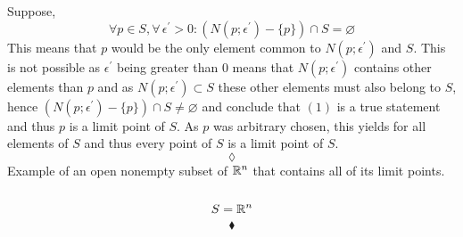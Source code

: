 Suppose, 
$$\forall p\in S, \forall\, \epsilon^{'}>0: \left(N(p;\epsilon^{'})-\{p\}\right)\cap S= \varnothing $$
This means that $p$ would be the only element common to $N(p;\epsilon^{'})$ and $S$. This is not possible as $\epsilon^{'}$ being greater than $0$ means that $N(p;\epsilon^{'})$ contains other elements than $p$ and as $N(p;\epsilon^{'})\subset S$ these other elements must also belong to $S$, hence $\left(N(p;\epsilon^{'})-\{p\}\right)\cap S \neq \varnothing $ and conclude that $(1)$ is a true statement and thus $p$ is a limit point of $S$. As $p$ was arbitrary chosen, this yields for all elements of $S$ and thus every point of $S$ is a limit point of $S$.  
$$\lozenge$$
Example of an open nonempty subset of $\mathbb{R}^n$ that contains all of its limit points.\\\\
$$S=\mathbb{R}^n$$
$$\blacklozenge$$\\


